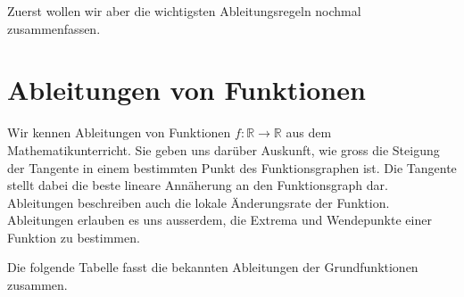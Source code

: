\documentclass[
  a4paper,
  DIV=11]{scrreprt}
\theoremstyle{definition}
\theoremstyle{definition}
\theoremstyle{remark}
\begin{document}
Zuerst wollen wir aber die wichtigsten Ableitungsregeln nochmal
zusammenfassen.

\hypertarget{sec-AbleitungenUebersicht}{%
\section{Ableitungen von Funktionen}\label{sec-AbleitungenUebersicht}}

Wir kennen Ableitungen von Funktionen
\(f: \mathbb{R}\rightarrow\mathbb{R}\) aus dem Mathematikunterricht. Sie
geben uns darüber Auskunft, wie gross die Steigung der Tangente in einem
bestimmten Punkt des Funktionsgraphen ist. Die Tangente stellt dabei die
beste lineare Annäherung an den Funktionsgraph dar. Ableitungen
beschreiben auch die lokale Änderungsrate der Funktion. Ableitungen
erlauben es uns ausserdem, die Extrema und Wendepunkte einer Funktion zu
bestimmen.

Die folgende Tabelle fasst die bekannten Ableitungen der Grundfunktionen
zusammen.
\end{document}
